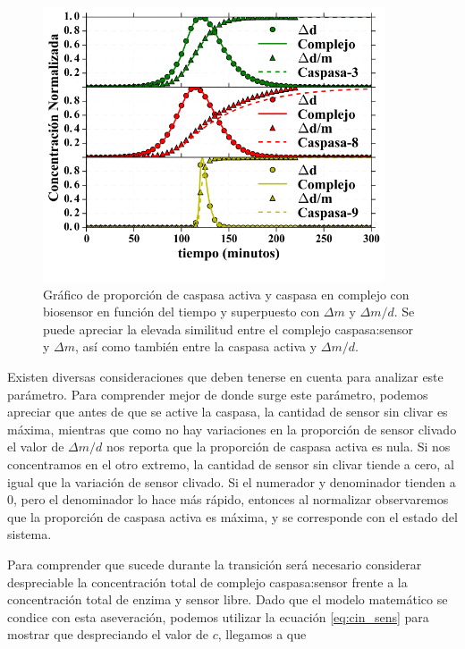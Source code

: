 \begin{figure}
    \centering
    \includegraphics[width=0.9\textwidth]{./img/Cap3/Metodo.png}
    \caption{Gráfico de proporción de caspasa activa y caspasa en complejo con biosensor en función del tiempo y superpuesto con $\Delta m$ y $\Delta m/d$. Se puede apreciar la elevada similitud entre el complejo caspasa:sensor y $\Delta m$, así como también entre la caspasa activa y $\Delta m/d$.}
    \label{fig:Deltams}
\end{figure}

Existen diversas consideraciones que deben tenerse en cuenta para analizar este parámetro. Para comprender mejor de donde surge este parámetro, podemos apreciar que antes de que se active la caspasa, la cantidad de sensor sin clivar es máxima, mientras que como no hay variaciones en la proporción de sensor clivado el valor de $\Delta m/d$ nos reporta que la proporción de caspasa activa es nula. Si nos concentramos en el otro extremo, la cantidad de sensor sin clivar tiende a cero, al igual que la variación de sensor clivado. Si el numerador y denominador tienden a 0, pero el denominador lo hace más rápido, entonces al normalizar observaremos que la proporción de caspasa activa es máxima, y se corresponde con el estado del sistema.

Para comprender que sucede durante la transición será necesario considerar despreciable la concentración total de complejo caspasa:sensor frente a la concentración total de enzima y sensor libre. Dado que el modelo matemático se condice con esta aseveración, podemos utilizar la ecuación \ref{eq:cin_sens} para mostrar que despreciando el valor de $c$, llegamos a que

